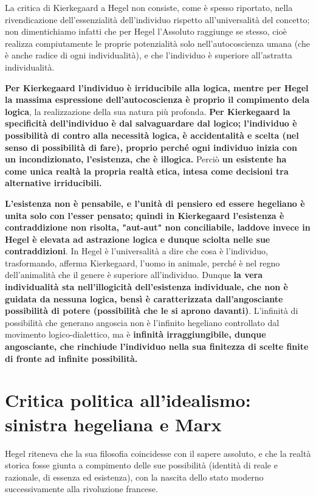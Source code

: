 La critica di Kierkegaard a Hegel non consiste, come è spesso riportato, nella rivendicazione dell'essenzialità dell'individuo rispetto all'universalità del concetto; non dimentichiamo infatti che per Hegel l'Assoluto raggiunge se stesso, cioè realizza compiutamente le proprie potenzialità solo nell'autocoscienza umana (che è anche radice di ogni individualità), e che l'individuo è superiore all'astratta individualità.

 \textbf{Per Kierkegaard l'individuo è irriducibile alla logica, mentre per Hegel la massima espressione dell'autocoscienza è proprio il compimento dela logica}, la realizzazione della sua natura più profonda. \textbf{Per Kierkegaard la specificità dell'individuo è dal salvaguardare dal logico; l'individuo è possibilità di contro alla necessità logica, è accidentalità e scelta (nel senso di possibilità di fare), proprio perché ogni individuo inizia con un incondizionato, l'esistenza, che è illogica.} Perciò \textbf{un esistente ha come unica realtà la propria realtà etica, intesa come decisioni tra alternative irriducibili.} 
 
 \textbf{L'esistenza non è pensabile, e l'unità di pensiero ed essere hegeliano è unita solo con l'esser pensato; quindi in Kierkegaard l'esistenza è contraddizione non risolta, "aut-aut" non conciliabile, laddove invece in Hegel è elevata ad astrazione logica e dunque sciolta nelle sue contraddizioni}. In Hegel è l'universalità  a dire che cosa è l'individuo, trasformando, afferma Kierkegaard, l'uomo in animale, perché è nel regno dell'animalità che il genere è superiore all'individuo. Dunque \textbf{la vera individualità sta nell'illogicità dell'esistenza individuale, che non è guidata da nessuna logica, bensì è caratterizzata dall'angosciante possibilità di potere (possibilità che le si aprono davanti)}. L'infinità di possibilità che generano angoscia non è l'infinito hegeliano controllato dal movimento logico-dialettico, ma è \textbf{infinità irraggiungibile, dunque angosciante, che rinchiude l'individuo nella sua finitezza di scelte finite di fronte ad infinite possibilità.}
 
 \section{Critica politica all'idealismo: sinistra hegeliana e Marx}
 
 Hegel riteneva che la sua filosofia coincidesse con il sapere assoluto, e che la realtà storica fosse giunta a compimento delle sue possibilità (identità di reale e razionale, di essenza ed esistenza), con la nascita dello stato moderno successivamente alla rivoluzione francese.
 
